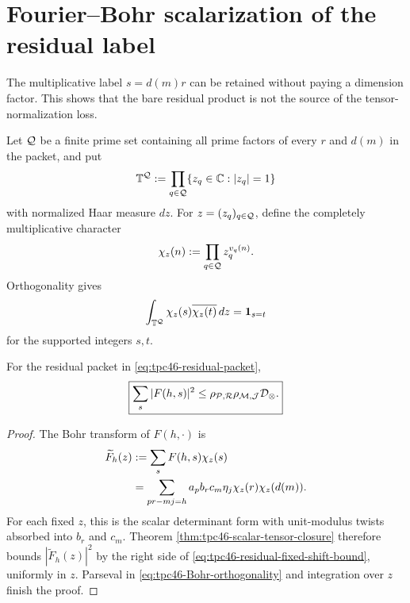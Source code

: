 \section{Fourier--Bohr scalarization of the residual label}
\label{sec:tpc46-bohr}

The multiplicative label \(s=d(m)r\) can be retained without paying a
dimension factor.  This shows that the bare residual product is not the
source of the tensor-normalization loss.

Let \(\mathcal Q\) be a finite prime set containing all prime factors of every
\(r\) and \(d(m)\) in the packet, and put
\begin{equation}
 \mathbb T^{\mathcal Q}:=\prod_{q\in\mathcal Q}\{z_q\in\mathbb C:|z_q|=1\}
 \label{eq:tpc46-Bohr-torus}
\end{equation}
with normalized Haar measure \(dz\).  For
\(z=(z_q)_{q\in\mathcal Q}\), define the completely multiplicative character
\begin{equation}
 \chi_z(n):=\prod_{q\in\mathcal Q}z_q^{v_q(n)}.
 \label{eq:tpc46-Bohr-character}
\end{equation}
Orthogonality gives
\begin{equation}
 \int_{\mathbb T^{\mathcal Q}}\chi_z(s)\overline{\chi_z(t)}\,dz
 =\mathbf 1_{s=t}
 \label{eq:tpc46-Bohr-orthogonality}
\end{equation}
for the supported integers \(s,t\).

\begin{theorem}
\label{thm:tpc46-residual-fixed-shift}
For the residual packet in \eqref{eq:tpc46-residual-packet},
\begin{equation}
 \boxed{
 \sum_s|F(h,s)|^2
 \le
 \rho_{\mathcal P,\mathcal R}\rho_{\mathcal M,\mathcal J}\mathcal D_\otimes.}
 \label{eq:tpc46-residual-fixed-shift-bound}
\end{equation}
\end{theorem}

\begin{proof}
The Bohr transform of \(F(h,\cdot)\) is
\begin{align}
 \widetilde F_h(z)
 &:=
 \sum_sF(h,s)\chi_z(s)\notag\\
 &=\sum_{pr-mj=h}
 a_pb_rc_m\eta_j\chi_z(r)\chi_z(d(m)).
 \label{eq:tpc46-residual-Bohr-transform}
\end{align}
For each fixed \(z\), this is the scalar determinant form with
unit-modulus twists absorbed into \(b_r\) and \(c_m\).  Theorem
\ref{thm:tpc46-scalar-tensor-closure} therefore bounds
\(|\widetilde F_h(z)|^2\) by the right side of
\eqref{eq:tpc46-residual-fixed-shift-bound}, uniformly in \(z\).
Parseval in \eqref{eq:tpc46-Bohr-orthogonality} and integration over
\(z\) finish the proof.
\end{proof}

